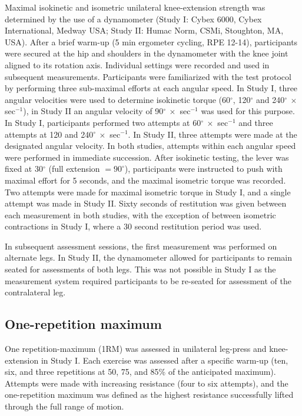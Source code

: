 \documentclass[twoside,10pt]{gihclass} %
\begin{document}
Maximal isokinetic and isometric unilateral knee-extension strength was determined by the use of a dynamometer (Study I: Cybex 6000, Cybex International, Medway USA; Study II: Humac Norm, CSMi, Stoughton, MA, USA).
After a brief warm-up (5 min ergometer cycling, RPE 12-14), participants were secured at the hip and shoulders in the dynamometer with the knee joint aligned to its rotation axis.
Individual settings were recorded and used in subsequent measurements.
Participants were familiarized with the test protocol by performing three sub-maximal efforts at each angular speed.
In Study I, three angular velocities were used to determine isokinetic torque (60\(^{\circ}\), 120\(^{\circ}\) and 240\(^{\circ} ~\times\) sec\(^{-1}\)), in Study II an angular velocity of 90\(^{\circ} ~\times\) sec\(^{-1}\) was used for this purpose.
In Study I, participants performed two attempts at 60\(^{\circ} ~\times\) sec\(^{-1}\) and three attempts at 120 and 240\(^{\circ}~\times\) sec\(^{-1}\).
In Study II, three attempts were made at the designated angular velocity.
In both studies, attempts within each angular speed were performed in immediate succession.
After isokinetic testing, the lever was fixed at 30\(^{\circ}\) (full extension \(=90^{\circ}\)), participants were instructed to push with maximal effort for 5 seconds, and the maximal isometric torque was recorded.
Two attempts were made for maximal isometric torque in Study I, and a single attempt was made in Study II.
Sixty seconds of restitution was given between each measurement in both studies, with the exception of between isometric contractions in Study I, where a 30 second restitution period was used.

In subsequent assessment sessions, the first measurement was performed on alternate legs.
In Study II, the dynamometer allowed for participants to remain seated for assessments of both legs. This was not possible in Study I as the measurement system required participants to be re-seated for assessment of the contralateral leg.

\hypertarget{one-repetition-maximum}{%
\subsection{One-repetition maximum}\label{one-repetition-maximum}}

One repetition-maximum (1RM) was assessed in unilateral leg-press and knee-extension in Study I.
Each exercise was assessed after a specific warm-up (ten, six, and three repetitions at 50, 75, and 85\% of the anticipated maximum). Attempts were made with increasing resistance (four to six attempts), and the one-repetition maximum was defined as the highest resistance successfully lifted through the full range of motion.
\end{document}
